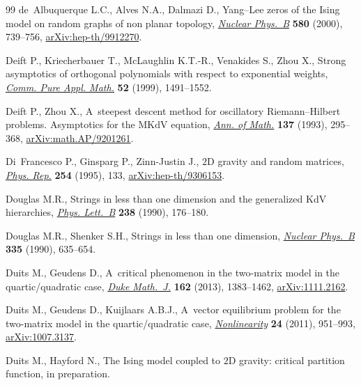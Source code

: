 \begin{thebibliography}{99}
de~Albuquerque L.C., Alves N.A., Dalmazi D., Yang--{L}ee zeros of the {I}sing
 model on random graphs of non planar topology,
 \href{https://doi.org/10.1016/S0550-3213(00)00290-X}{\textit{Nuclear
 Phys.~B}} \textbf{580} (2000), 739--756,
 \href{http://arxiv.org/abs/hep-th/9912270}{arXiv:hep-th/9912270}.

Deift P., Kriecherbauer T., McLaughlin K.T.-R., Venakides S., Zhou X., Strong
 asymptotics of orthogonal polynomials with respect to exponential weights,
 \href{https://doi.org/10.1002/(SICI)1097-0312(199912)52:12%3C1491::AID-CPA2%3E3.0.CO;2-%23}{\textit{Comm.
 Pure Appl. Math.}} \textbf{52} (1999), 1491--1552.

Deift P., Zhou X., A~steepest descent method for oscillatory
 {R}iemann--{H}ilbert problems. {A}symptotics for the {MK}d{V} equation,
 \href{https://doi.org/10.2307/2946540}{\textit{Ann. of Math.}} \textbf{137}
 (1993), 295--368,
 \href{http://arxiv.org/abs/math.AP/9201261}{arXiv:math.AP/9201261}.

Di~Francesco P., Ginsparg P., Zinn-Justin J., {$2$}{D} gravity and random
 matrices, \href{https://doi.org/10.1016/0370-1573(94)00084-G}{\textit{Phys.
 Rep.}} \textbf{254} (1995), 133,
 \href{http://arxiv.org/abs/hep-th/9306153}{arXiv:hep-th/9306153}.

Douglas M.R., Strings in less than one dimension and the generalized {K}d{V}
 hierarchies,
 \href{https://doi.org/10.1016/0370-2693(90)91716-O}{\textit{Phys. Lett.~B}}
 \textbf{238} (1990), 176--180.

Douglas M.R., Shenker S.H., Strings in less than one dimension,
 \href{https://doi.org/10.1016/0550-3213(90)90522-F}{\textit{Nuclear Phys.~B}}
 \textbf{335} (1990), 635--654.

Duits M., Geudens D., A~critical phenomenon in the two-matrix model in the
 quartic/quadratic case,
 \href{https://doi.org/10.1215/00127094-2208757}{\textit{Duke Math.~J.}}
 \textbf{162} (2013), 1383--1462,
 \href{http://arxiv.org/abs/1111.2162}{arXiv:1111.2162}.

Duits M., Geudens D., Kuijlaars A.B.J., A~vector equilibrium problem for the
 two-matrix model in the quartic/quadratic case,
 \href{https://doi.org/10.1088/0951-7715/24/3/012}{\textit{Nonlinearity}}
 \textbf{24} (2011), 951--993,
 \href{http://arxiv.org/abs/1007.3137}{arXiv:1007.3137}.

Duits M., Hayford N., The {I}sing model coupled to {$2$}{D} gravity: critical
 partition function, {i}n preparation.


\end{thebibliography}

